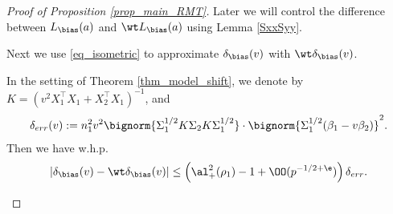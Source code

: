\documentclass[aos,preprint]{imsart}
\begin{document}
\begin{proof}[Proof of Proposition \ref{prop_main_RMT}]
			Later we will control the difference between $ L_{\bias} (a) $ and $\wt L_{\bias} (a) $ using Lemma \ref{SxxSyy}.  
			{\cor
			Next we use \eqref{eq_isometric} to approximate $\delta_{\bias}(v)$ with $\wt\delta_{\bias}(v)$. %
\begin{claim}\label{prop_model_shift}
	In the setting of Theorem \ref{thm_model_shift},
	we denote by $K = (v^2X_1^{\top}X_1 + X_2^{\top}X_1)^{-1}$, and
	\begin{align*}
		\delta_{err}(v) := n_1^2 v^2 \bignorm{\Sigma_1^{1/2} K \Sigma_2 K \Sigma_1^{1/2}} \cdot \bignorm{\Sigma_1^{1/2} (\beta_1 - v\beta_2)}^2.
	\end{align*}
	Then we have w.h.p.
	\begin{align*}
		 \left| \delta_{\bias}(v)-\wt\delta_{\bias}(v)\right| 
		\le  \left( \al_+^2(\rho_1)-1 + \OO(p^{-1/2+\e})\right)\delta_{err}.
	\end{align*}
\end{claim}

}
\end{proof}
\end{document}
